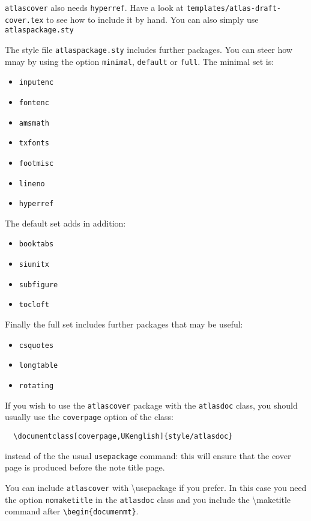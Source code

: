 \documentclass[UKenglish]{style/atlasdoc}
\newcommand{\Macro}[1]{\textbackslash #1\xspace}
\begin{document}
\texttt{atlascover} also needs \texttt{hyperref}. 
Have a look at \texttt{templates/atlas-draft-cover.tex} to see how to include it by hand.
You can also simply use \texttt{atlaspackage.sty}

The style file \texttt{atlaspackage.sty} includes further packages.
You can steer how mnay by using the option \texttt{minimal}, \texttt{default} or \texttt{full}.
The minimal set is:
\begin{itemize}\setlength{\parskip}{0pt}\setlength{\itemsep}{0pt}
\item \texttt{inputenc}
\item \texttt{fontenc}
\item \texttt{amsmath}
\item \texttt{txfonts}
\item \texttt{footmisc}
\item \texttt{lineno}
\item \texttt{hyperref}
\end{itemize}

The default set adds in addition:
\begin{itemize}\setlength{\parskip}{0pt}\setlength{\itemsep}{0pt}
\item \texttt{booktabs}
\item \texttt{siunitx}
\item \texttt{subfigure}
\item \texttt{tocloft}
\end{itemize}

Finally the full set includes further packages that may be useful:
\begin{itemize}\setlength{\parskip}{0pt}\setlength{\itemsep}{0pt}
\item \texttt{csquotes}
\item \texttt{longtable}
\item \texttt{rotating}
\end{itemize}

If you wish to use the \texttt{atlascover} package with the 
\texttt{atlasdoc} class, you should usually use the \texttt{coverpage} option of the class:
\begin{verbatim}
  \documentclass[coverpage,UKenglish]{style/atlasdoc}
\end{verbatim}
instead of the the usual \texttt{usepackage} command: this will ensure
that the cover page is produced before the note title page.

You can include \texttt{atlascover} with \Macro{usepackage} if you prefer.
In this case you need the option \texttt{nomaketitle} in the \texttt{atlasdoc} class
and you include the \Macro{maketitle} command after \verb|\begin{documenmt}|.
\end{document}
